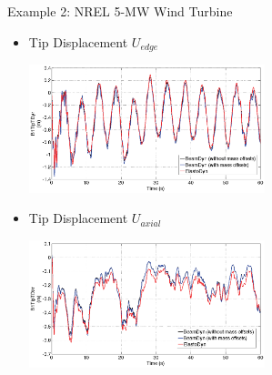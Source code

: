 \documentclass[xcolor=cmyk]{beamer}
\begin{document}
\begin{frame}{Example 2: NREL 5-MW Wind Turbine}
    \begin{itemize}
        \item
        Tip Displacement $U_{edge}$
         \begin{center}
         \includegraphics[width=2.7in]{EPSF/B1TipTDyr.eps}
         \end{center}
         \item
         Tip Displacement $U_{axial}$
         \begin{center}
         \includegraphics[width=2.7in]{EPSF/B1TipTDzr.eps}
         \end{center}
    \end{itemize}
\end{frame}
\end{document}
